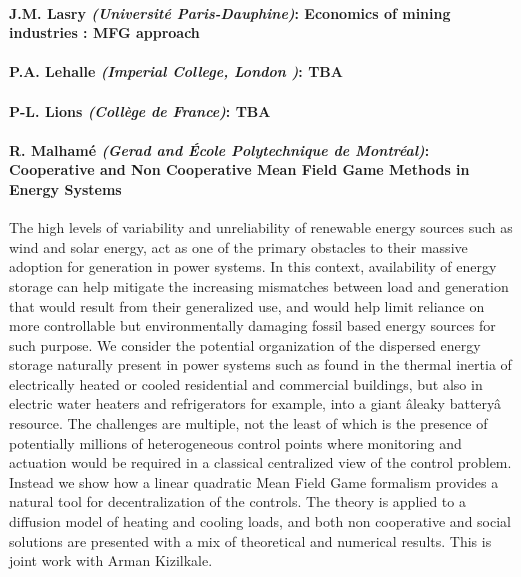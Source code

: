 \documentclass[11pt]{article}
\begin{document}
\paragraph{ J.M. Lasry  {\sl (Universit{\'e} Paris-Dauphine)}:
   Economics of mining industries : MFG approach }

\paragraph{P.A. Lehalle {\sl(Imperial College, London )}: TBA}


\paragraph{ P-L. Lions  {\sl (Coll{\`e}ge de France)}:
   TBA }

\paragraph{ R. Malham{\'e}  {\sl (Gerad and {\'E}cole Polytechnique de Montr{\'e}al)}:
   Cooperative and Non Cooperative Mean Field Game Methods in Energy Systems }

The high levels of variability and unreliability of renewable energy sources such as wind and
solar energy, act as one of the primary obstacles to their massive adoption for generation in
power systems. In this context, availability of energy storage can help mitigate the increasing
mismatches between load and generation that would result from their generalized use, and
would help limit reliance on more controllable but environmentally damaging fossil based
energy sources for such purpose.
We consider the potential organization of the dispersed energy storage naturally present in
power systems such as found in the thermal inertia of electrically heated or cooled residential
and commercial buildings, but also in electric water heaters and refrigerators for example, into a
giant {\^a}leaky battery{\^a} resource. The challenges are multiple, not the least of which is the
presence of potentially millions of heterogeneous control points where monitoring and
actuation would be required in a classical centralized view of the control problem. Instead we
show how a linear quadratic Mean Field Game formalism provides a natural tool for
decentralization of the controls. The theory is applied to a diffusion model of heating and
cooling loads, and both non cooperative and social solutions are presented with a mix of
theoretical and numerical results. This is joint work with Arman Kizilkale.
\end{document}

